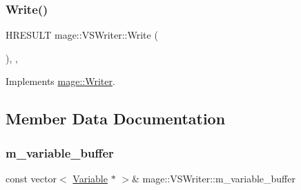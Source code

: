 \subsubsection{\texorpdfstring{Write()}{Write()}}
{\footnotesize\ttfamily H\+R\+E\+S\+U\+LT mage\+::\+V\+S\+Writer\+::\+Write (\begin{DoxyParamCaption}{ }\end{DoxyParamCaption})\hspace{0.3cm}{\ttfamily [override]}, {\ttfamily [private]}, {\ttfamily [virtual]}}



Implements \hyperlink{classmage_1_1_writer_a7ef124095098e7ea8f95e3be16499be3}{mage\+::\+Writer}.



\subsection{Member Data Documentation}
\hypertarget{classmage_1_1_v_s_writer_a4fa655fa7c7d09a9439a22061ceab0f4}{}\label{classmage_1_1_v_s_writer_a4fa655fa7c7d09a9439a22061ceab0f4} 
\subsubsection{\texorpdfstring{m\+\_\+variable\+\_\+buffer}{m\_variable\_buffer}}
{\footnotesize\ttfamily const vector$<$ \hyperlink{structmage_1_1_variable}{Variable} $\ast$ $>$\& mage\+::\+V\+S\+Writer\+::m\+\_\+variable\+\_\+buffer\hspace{0.3cm}{\ttfamily [private]}}

